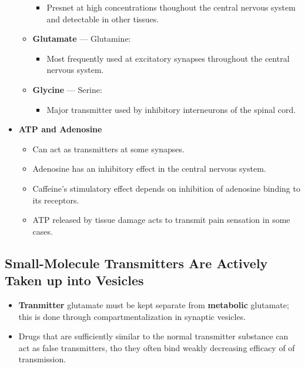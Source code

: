 \documentclass[12pt,a4paper]{article}
\begin{document}
\begin{itemize}
\begin{itemize}
\begin{itemize}
                        \item Presnet at high concentrations thoughout the central nervous system and detectable in other tissues.
                    \end{itemize}
                \item \textbf{Glutamate} --- Glutamine:
                \begin{itemize}
                    \item Most frequently used at excitatory synapses throughout the central nervous system.
                \end{itemize}
                \item \textbf{Glycine} --- Serine:
                    \begin{itemize}
                        \item Major transmitter used by inhibitory interneurons of the spinal cord.
                    \end{itemize}
            \end{itemize}
        \item \textbf{ATP and Adenosine}
            \begin{itemize}
                \item Can act as transmitters at some synapses.
                \item Adenosine has an inhibitory effect in the central nervous system.
                \item Caffeine's stimulatory effect depends on inhibition of adenosine binding to its receptors.
                \item ATP released by tissue damage acts to transmit pain sensation in some cases.
            \end{itemize}
\end{itemize}

\subsection{Small-Molecule Transmitters Are Actively Taken up into Vesicles}
\begin{itemize}
    \item \textbf{Tranmitter} glutamate must be kept separate from \textbf{metabolic} glutamate; this is done through compartmentalization in synaptic vesicles.
    \item Drugs that are sufficiently similar to the normal transmitter substance can act as false transmitters, tho they often bind weakly decreasing efficacy of of transmission.
\end{itemize}
\end{document}
